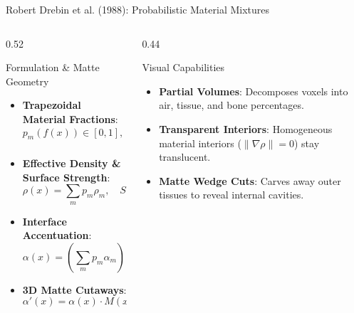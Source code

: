 \documentclass[aspectratio=169,11pt]{beamer}
\begin{document}
\begin{frame}{Robert Drebin et al. (1988): Probabilistic Material Mixtures}
  \begin{columns}[T]
    \begin{column}{0.52\textwidth}
      \begin{block}{Formulation \& Matte Geometry}
        \begin{itemize}
          \item \textbf{Trapezoidal Material Fractions}:
            $$p_m(f(x)) \in [0, 1], \quad \sum_{m} p_m = 1$$
          \item \textbf{Effective Density \& Surface Strength}:
            $$\rho(x) = \sum_m p_m \rho_m, \quad S(x) = \|\nabla \rho(x)\|$$
          \item \textbf{Interface Accentuation}:
            $$\alpha(x) = \left(\sum_m p_m \alpha_m\right) \cdot \min(1.0, \, k_s S(x))$$
          \item \textbf{3D Matte Cutaways}:
            $$\alpha'(x) = \alpha(x) \cdot M(x)$$
        \end{itemize}
      \end{block}
    \end{column}

    \begin{column}{0.44\textwidth}
      \begin{block}{Visual Capabilities}
        \begin{itemize}
          \item \textbf{Partial Volumes}: Decomposes voxels into air, tissue, and bone percentages.
          \item \textbf{Transparent Interiors}: Homogeneous material interiors ($\|\nabla \rho\| = 0$) stay translucent.
          \item \textbf{Matte Wedge Cuts}: Carves away outer tissues to reveal internal cavities.
        \end{itemize}
      \end{block}
    \end{column}
  \end{columns}
\end{frame}
\end{document}
